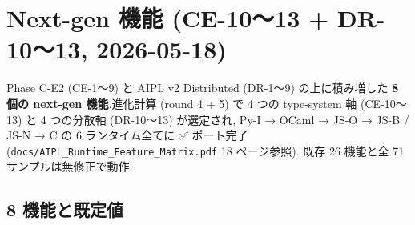 \documentclass[11pt,a4paper]{article}
\begin{document}
\section{Next-gen 機能 (CE-10〜13 + DR-10〜13, 2026-05-18)}

\noindent{}


Phase C-E2 (CE-1〜9) と AIPL v2 Distributed (DR-1〜9) の上に積み増した
\textbf{8 個の next-gen 機能}.進化計算 (round 4 + 5) で 4 つの
type-system 軸 (CE-10〜13) と 4 つの分散軸 (DR-10〜13) が選定され,
Py-I → OCaml → JS-O → JS-B / JS-N → C の 6 ランタイム全てに ✅
ポート完了 (\texttt{docs/AIPL\_Runtime\_Feature\_Matrix.pdf} 18 ページ参照).
既存 26 機能と全 71 サンプルは無修正で動作.

\subsection{8 機能と既定値}
\end{document}
